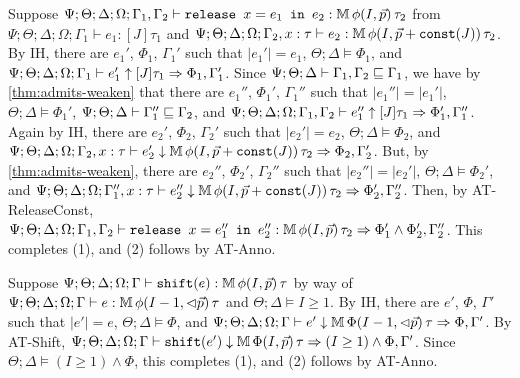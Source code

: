   \item[(T-ReleaseConst)] Suppose
  $\Psi ; \Theta ; \Delta ; \Omega ; \Gamma_1,\Gamma_2 \vdash \texttt{release } x = e_1 \texttt{ in }e_2 : \mathbb{M} \, \phi(I,\vec{p}) \, \tau_2$ from
  $\Psi ; \Theta ; \Delta ; \Omega ; \Gamma_1 \vdash e_1 : [J] \tau_1$ and
  $\Psi ; \Theta ; \Delta ; \Omega ; \Gamma_2, x : \tau \vdash e_2 : \mathbb{M} \, \phi(I,\vec{p} + \texttt{const}(J)) \, \tau_2$.
  By IH, there are $e_1'$, $\Phi_1$, $\Gamma_1'$ such that
  $|e_1'| = e_1$,
  $\Theta ; \Delta \vDash \Phi_1$, and
  $\Psi ; \Theta ; \Delta ; \Omega ; \Gamma_1 \vdash e_1' \uparrow [J] \tau_1 \Rightarrow \Phi_1,\Gamma_1'$.
  Since $\Psi ; \Theta ; \Delta \vdash \Gamma_1,\Gamma_2 \sqsubseteq \Gamma_1$, we have by \autoref{thm:admits-weaken}
  that there are $e_1''$, $\Phi_1'$, $\Gamma_1''$ such that
  $|e_1''| = |e_1'|$,
  $\Theta ; \Delta \vDash \Phi_1'$,
  $\Psi ; \Theta ; \Delta \vdash \Gamma_1'' \sqsubseteq \Gamma_2$, and
  $\Psi ; \Theta ; \Delta ; \Omega; \Gamma_1,\Gamma_2 \vdash e_1'' \uparrow [J] \tau_1 \Rightarrow \Phi_1',\Gamma_1''$.
  Again by IH, there are $e_2'$, $\Phi_2$, $\Gamma_2'$ such that
  $|e_2'| = e_2$,
  $\Theta ; \Delta \vDash \Phi_2$, and
  $\Psi ; \Theta ; \Delta ; \Omega ; \Gamma_2, x : \tau \vdash e_2' \downarrow \mathbb{M} \, \phi(I,\vec{p} + \texttt{const}(J)) \, \tau_2 \Rightarrow \Phi_2,\Gamma_2'$.
  But, by \autoref{thm:admits-weaken}, there are $e_2''$, $\Phi_2'$, $\Gamma_2''$ such that
  $|e_2''| = |e_2'|$,
  $\Theta ; \Delta \vDash \Phi_2'$, and
  $\Psi ; \Theta ; \Delta ; \Omega ; \Gamma_1'', x: \tau \vdash e_2'' \downarrow  \mathbb{M} \, \phi(I,\vec{p} + \texttt{const}(J)) \, \tau_2 \Rightarrow \Phi_2',\Gamma_2''$.
  Then, by AT-ReleaseConst, 
  $\Psi ; \Theta ; \Delta ; \Omega ; \Gamma_1,\Gamma_2 \vdash \texttt{release } x = e_1'' \texttt{ in }e_2'' : \mathbb{M} \, \phi(I,\vec{p}) \, \tau_2 \Rightarrow \Phi_1' \wedge \Phi_2',\Gamma_2''$.
  This completes (1), and (2) follows by AT-Anno.
  
  \item[(T-Shift)] Suppose $\Psi ; \Theta ; \Delta ; \Omega ; \Gamma \vdash \texttt{shift}(e) : \mathbb{M} \, \phi(I,\vec{p}) \, \tau$ by way of
  $\Psi ; \Theta ; \Delta ; \Omega ; \Gamma \vdash e : \mathbb{M} \, \phi(I - 1,\lhd \vec{p}) \, \tau$ and
  $\Theta ; \Delta \vDash I \geq 1$.
  By IH, there are $e'$, $\Phi$, $\Gamma'$ such that
  $|e'| = e$,
  $\Theta ; \Delta \vDash \Phi$, and
  $\Psi  ; \Theta ; \Delta ; \Omega; \Gamma \vdash e' \downarrow \mathbb{M} \, \Phi(I-1,\lhd \vec{p}) \, \tau \Rightarrow \Phi,\Gamma'$.
  By AT-Shift,
  $\Psi  ; \Theta ; \Delta ; \Omega; \Gamma \vdash \texttt{shift}(e') \downarrow \mathbb{M} \, \Phi(I,\vec{p}) \, \tau \Rightarrow (I \geq 1) \wedge \Phi,\Gamma'$.
  Since $\Theta ; \Delta \vDash (I \geq 1) \wedge \Phi$, this completes (1), and (2) follows by AT-Anno.

